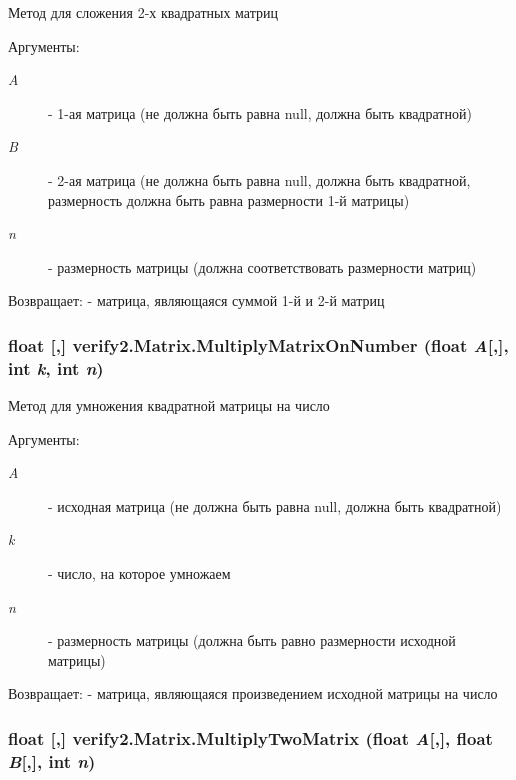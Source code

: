 Метод для сложения 2-х квадратных матриц \begin{Desc}
\item[Аргументы:]
\begin{description}
\item[{\em A}]- 1-ая матрица (не должна быть равна null, должна быть квадратной) \item[{\em B}]- 2-ая матрица (не должна быть равна null, должна быть квадратной, размерность должна быть равна размерности 1-й матрицы) \item[{\em n}]- размерность матрицы (должна соответствовать размерности матриц) \end{description}
\end{Desc}
\begin{Desc}
\item[Возвращает:]- матрица, являющаяся суммой 1-й и 2-й матриц \end{Desc}
\hypertarget{classverify2_1_1_matrix_a255bb2ea879291b3fe8a1637f21221c}{
\subsubsection[{MultiplyMatrixOnNumber}]{\setlength{\rightskip}{0pt plus 5cm}float \mbox{[},\mbox{]} verify2.Matrix.MultiplyMatrixOnNumber (float {\em A}\mbox{[},\mbox{]}, \/  int {\em k}, \/  int {\em n})}}
\label{classverify2_1_1_matrix_a255bb2ea879291b3fe8a1637f21221c}


Метод для умножения квадратной матрицы на число \begin{Desc}
\item[Аргументы:]
\begin{description}
\item[{\em A}]- исходная матрица (не должна быть равна null, должна быть квадратной) \item[{\em k}]- число, на которое умножаем \item[{\em n}]- размерность матрицы (должна быть равно размерности исходной матрицы) \end{description}
\end{Desc}
\begin{Desc}
\item[Возвращает:]- матрица, являющаяся произведением исходной матрицы на число \end{Desc}
\hypertarget{classverify2_1_1_matrix_c06fc6f590a0545afbcbb0133350579f}{
\subsubsection[{MultiplyTwoMatrix}]{\setlength{\rightskip}{0pt plus 5cm}float \mbox{[},\mbox{]} verify2.Matrix.MultiplyTwoMatrix (float {\em A}\mbox{[},\mbox{]}, \/  float {\em B}\mbox{[},\mbox{]}, \/  int {\em n})}}
\label{classverify2_1_1_matrix_c06fc6f590a0545afbcbb0133350579f}


